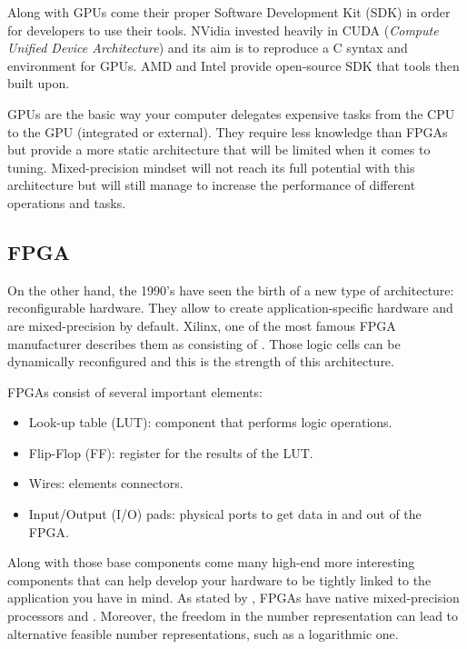 Along with GPUs come their proper Software Development Kit (SDK) in order for developers to use their tools. NVidia invested heavily in CUDA (\emph{Compute Unified Device Architecture}) \cite{CUDA} and its aim is to reproduce a C syntax and environment for GPUs. AMD and Intel provide open-source SDK that tools then built upon.

GPUs are the basic way your computer delegates expensive tasks from the CPU to the GPU (integrated or external). They require less knowledge than FPGAs but provide a more static architecture that will be limited when it comes to tuning. Mixed-precision mindset will not reach its full potential with this architecture but will still manage to increase the performance of different operations and tasks.


\subsection{FPGA}

On the other hand, the 1990's have seen the birth of a new type of architecture: reconfigurable hardware. They allow to create application-specific hardware and are mixed-precision by default. Xilinx, one of the most famous FPGA manufacturer describes them as consisting of  \cite{Xilinx}. Those logic cells can be dynamically reconfigured and this is the strength of this architecture.

FPGAs consist of several important elements:
\begin{itemize}
  \item Look-up table (LUT): component that performs logic operations.
  \item Flip-Flop (FF): register  for the results of the LUT.
  \item Wires: elements connectors.
  \item Input/Output (I/O) pads: physical ports to get data in and out of the FPGA.
\end{itemize}

Along with those base components come many high-end more interesting components that can help develop your hardware to be tightly linked to the application you have in mind. As stated by \cite{Goddeke2007}, FPGAs have native mixed-precision processors and . Moreover, the freedom in the number representation can lead to alternative feasible number representations, such as a logarithmic one.


